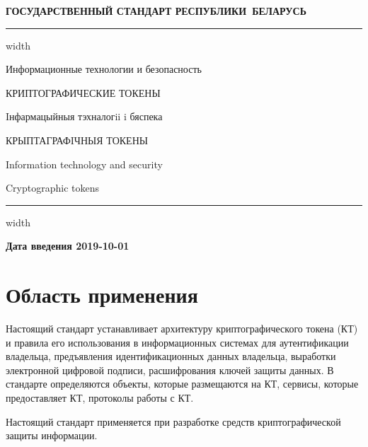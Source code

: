 \newpage
\setcounter{page}{1}
\pagestyle{headings}

\begin{center}
{\bfseries
ГОСУДАРСТВЕННЫЙ СТАНДАРТ РЕСПУБЛИКИ~БЕЛАРУСЬ
\vskip 2pt
\hrule width\textwidth

\vskip 9pt

Информационные технологии и безопасность

КРИПТОГРАФИЧЕСКИЕ ТОКЕНЫ

\vskip 9pt

Iнфармацыйныя тэхналогii i бяспека

КРЫПТАГРАФIЧНЫЯ ТОКЕНЫ
} %

\vskip 9pt

Information technology and security

Cryptographic tokens

\vskip 4pt                
\hrule width \textwidth
\end{center}

\mbox{}\hfill{\bfseries Дата введения 2019-10-01}

\chapter{Область применения}

Настоящий стандарт устанавливает архитектуру
криптографического токена (КТ) и правила его
использования в информационных системах для аутентификации владельца, 
предъявления идентификационных данных владельца, выработки электронной цифровой 
подписи, расшифрования ключей защиты данных.
%
В стандарте определяются объекты, которые размещаются на КТ,
сервисы, которые предоставляет КТ, протоколы работы с КТ.

Настоящий стандарт применяется при разработке средств криптографической 
защиты информации.

